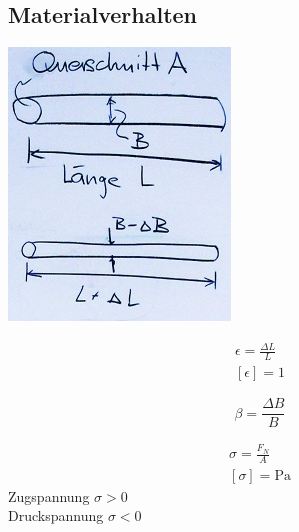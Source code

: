 \subsection{Materialverhalten}
\includegraphics{Bild41} \\
\begin{def*}[ note = Dehnung , index = Dehnung ]
	\begin{gather*}
		\epsilon = \frac{\Delta L}{L} \\
		[ \epsilon ] = 1
	\end{gather*}
\end{def*}
\begin{def*}[ note = Querkontraktion , index = Querkontraktion ]
	\[ \beta = \frac{\Delta B}{B} \]
\end{def*}
\begin{def*}[ note = Normalspannung , index = Normalspannung ]
	\begin{gather*}
		\sigma = \frac{F_N}{A} \\
		[ \sigma ] = \si{\pascal}
	\end{gather*}
	Zugspannung $\sigma > 0$ \\
	Druckspannung $\sigma < 0$
\end{def*}

